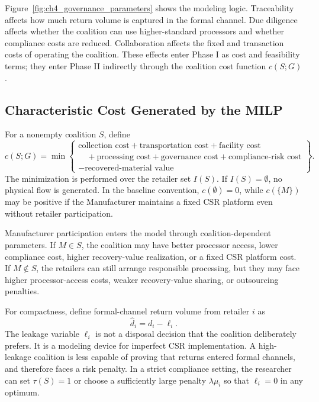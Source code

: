 Figure~\ref{fig:ch4_governance_parameters} shows the modeling logic. Traceability affects how much return volume is captured in the formal channel. Due diligence affects whether the coalition can use higher-standard processors and whether compliance costs are reduced. Collaboration affects the fixed and transaction costs of operating the coalition. These effects enter Phase I as cost and feasibility terms; they enter Phase II indirectly through the coalition cost function $c(S;G)$.

\subsection{Characteristic Cost Generated by the MILP}

For a nonempty coalition $S$, define
\begin{equation}
\label{eq:ch4_characteristic_cost}
c(S;G)=
\min
\left\{
\begin{array}{l}
\text{collection cost}
+\text{transportation cost}
+\text{facility cost}\\
\quad+\text{processing cost}
+\text{governance cost}
+\text{compliance-risk cost}\\
-\text{recovered-material value}
\end{array}
\right\}.
\end{equation}
The minimization is performed over the retailer set $I(S)$. If $I(S)=\emptyset$, no physical flow is generated. In the baseline convention, $c(\emptyset)=0$, while $c(\{M\})$ may be positive if the Manufacturer maintains a fixed CSR platform even without retailer participation.

Manufacturer participation enters the model through coalition-dependent parameters. If $M\in S$, the coalition may have better processor access, lower compliance cost, higher recovery-value realization, or a fixed CSR platform cost. If $M\notin S$, the retailers can still arrange responsible processing, but they may face higher processor-access costs, weaker recovery-value sharing, or outsourcing penalties.

For compactness, define formal-channel return volume from retailer $i$ as
\begin{equation}
\label{eq:ch4_formal_volume}
\widehat d_i=d_i-\ell_i.
\end{equation}
The leakage variable $\ell_i$ is not a disposal decision that the coalition deliberately prefers. It is a modeling device for imperfect CSR implementation. A high-leakage coalition is less capable of proving that returns entered formal channels, and therefore faces a risk penalty. In a strict compliance setting, the researcher can set $\tau(S)=1$ or choose a sufficiently large penalty $\lambda\mu_i$ so that $\ell_i=0$ in any optimum.

